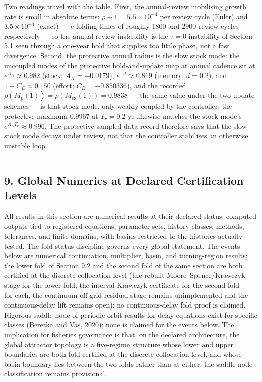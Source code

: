 \documentclass[11pt]{article}
\begin{document}
Two readings travel with the table. First, the annual-review mobilising
growth rate is small in absolute terms: \(\rho - 1 = 5.5\times10^{-4}\)
per review cycle (Euler) and \(3.5\times10^{-4}\) (exact) --- e-folding
times of roughly \(1800\) and \(2900\) review cycles respectively --- so
the annual-review instability is the \(\tau = 0\) instability of Section
5.1 seen through a one-year hold that supplies too little phase, not a
fast divergence. Second, the protective annual radius is the slow stock
mode: the uncoupled modes of the protective hold-and-update map at
annual cadence sit at \(e^{A_N} \approx 0.982\) (stock;
\(A_N = -0.0179\)), \(e^{-d} \approx 0.819\) (memory; \(d = 0.2\)), and
\(1 + C_E \approx 0.150\) (effort; \(C_E = -0.850336\)), and the
recorded \(\rho(M_p(1)) = \rho(M_{\mathrm{ex}}(1)) = 0.9838\) --- the
same value under the two update schemes --- is that stock mode, only
weakly coupled by the controller; the protective maximum \(0.9967\) at
\(T_r = 0.2\) yr likewise matches the stock mode's
\(e^{A_N T_r} \approx 0.996\). The protective sampled-data record
therefore says that the slow stock mode decays under review, not that
the controller stabilises an otherwise unstable loop.

\begin{center}\rule{0.5\linewidth}{0.5pt}\end{center}

\subsection{9. Global Numerics at Declared Certification
Levels}\label{global-numerics-at-declared-certification-levels}

All results in this section are numerical results at their declared
status: computed outputs tied to registered equations, parameter sets,
history classes, methods, tolerances, and finite domains, with basins
restricted to the histories actually tested. The fold-status discipline
governs every global statement. The events below are numerical
continuation, multiplier, basin, and turning-region results; the lower
fold of Section 9.2 and the second fold of the same section are both
certified at the discrete collocation level (the rebuilt
Moore--Spence/Krawczyk stage for the lower fold; the interval-Krawczyk
certificate for the second fold --- for each, the continuum off-grid
residual stage remains unimplemented and the continuous-delay lift
remains open); no continuous-delay fold proof is claimed. Rigorous
saddle-node-of-periodic-orbit results for delay equations exist for
specific classes (Beretka and Vas, 2020); none is claimed for the events
below. The implication for fisheries governance is that, on the declared
architecture, the global attractor topology is a five-regime structure
whose lower and upper boundaries are both fold-certified at the discrete
collocation level, and whose basin boundary lies between the two folds
rather than at either; the saddle-node classification remains
provisional.
\end{document}
